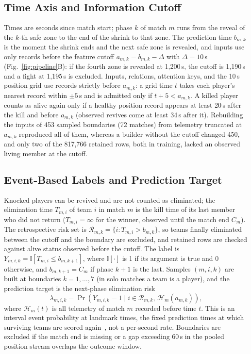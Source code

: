 \documentclass[sigconf,anonymous]{acmart}
\begin{document}
\subsection{Time Axis and Information Cutoff}
\label{sec:method:samples}
Times are seconds since match start; phase $k$ of match $m$ runs from the reveal of the $k$-th safe zone to the end of the shrink to that zone. The prediction time $b_{m,k}$ is the moment the shrink ends and the next safe zone is revealed, and inputs use only records before the feature cutoff $a_{m,k}=b_{m,k}-\Delta$ with $\Delta=10$\,s (Fig.~\ref{fig:pipeline}B): if the fourth zone is revealed at 1,200\,s, the cutoff is 1,190\,s and a fight at 1,195\,s is excluded. Inputs, relations, attention keys, and the 10\,s position grid use records strictly before $a_{m,k}$: a grid time $t$ takes each player's nearest record within $\pm5$\,s and is admitted only if $t+5<a_{m,k}$. A killed player counts as alive again only if a healthy position record appears at least 20\,s after the kill and before $a_{m,k}$ (observed revives come at least 34\,s after it). Rebuilding the inputs of 453 sampled boundaries (72 matches) from telemetry truncated at $a_{m,k}$ reproduced all of them, whereas a builder without the cutoff changed 450, and only two of the 817,766 retained rows, both in training, lacked an observed living member at the cutoff.

\subsection{Event-Based Labels and Prediction Target}
\label{sec:method:labels}
Knocked players can be revived and are not counted as eliminated; the elimination time $T_{m,i}$ of team $i$ in match $m$ is the kill time of its last member who did not return ($T_{m,i}=\infty$ for the winner, observed until the match end $C_m$). The retrospective risk set is $\mathcal{R}_{m,k}=\{i:T_{m,i}>b_{m,k}\}$, so teams finally eliminated between the cutoff and the boundary are excluded, and retained rows are checked against alive status observed before the cutoff. The label is $Y_{m,i,k}=\mathbb{I}[T_{m,i}\le b_{m,k+1}]$, where $\mathbb{I}[\cdot]$ is 1 if its argument is true and 0 otherwise, and $b_{m,k+1}=C_m$ if phase $k+1$ is the last. Samples $(m,i,k)$ are built at boundaries $k=1,\dots,7$ (in solo matches a team is a player), and the prediction target is the next-phase elimination risk
\begin{equation}
\lambda_{m,i,k}=\Pr\!\left(Y_{m,i,k}=1 \mid i\in\mathcal{R}_{m,k},\,\mathcal{H}_{m}(a_{m,k})\right),
\label{eq:hazard}
\end{equation}
where $\mathcal{H}_{m}(t)$ is all telemetry of match $m$ recorded before time $t$. This is an interval event probability at landmark times, the fixed prediction times at which surviving teams are scored again~\cite{vanHouwelingen07}, not a per-second rate. Boundaries are excluded if the match end is missing or a gap exceeding 60\,s in the pooled position stream overlaps the outcome window.
\end{document}
